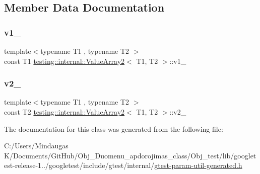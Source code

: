 \subsection{Member Data Documentation}
\mbox{\label{classtesting_1_1internal_1_1_value_array2_ac046b318215dba521f67369bdb4ce535}} 
\subsubsection{\texorpdfstring{v1\_}{v1\_}}
{\footnotesize\ttfamily template$<$typename T1 , typename T2 $>$ \\
const T1 \mbox{\hyperlink{classtesting_1_1internal_1_1_value_array2}{testing\+::internal\+::\+Value\+Array2}}$<$ T1, T2 $>$\+::v1\+\_\+\hspace{0.3cm}{\ttfamily [private]}}

\mbox{\label{classtesting_1_1internal_1_1_value_array2_aa90e4945eb1d86d978485db2666d25b1}} 
\subsubsection{\texorpdfstring{v2\_}{v2\_}}
{\footnotesize\ttfamily template$<$typename T1 , typename T2 $>$ \\
const T2 \mbox{\hyperlink{classtesting_1_1internal_1_1_value_array2}{testing\+::internal\+::\+Value\+Array2}}$<$ T1, T2 $>$\+::v2\+\_\+\hspace{0.3cm}{\ttfamily [private]}}



The documentation for this class was generated from the following file\+:\begin{DoxyCompactItemize}
\item 
C\+:/\+Users/\+Mindaugas K/\+Documents/\+Git\+Hub/\+Obj\+\_\+\+Duomenu\+\_\+apdorojimas\+\_\+class/\+Obj\+\_\+test/lib/googletest-\/release-\/1../googletest/include/gtest/internal/\mbox{\hyperlink{gtest-param-util-generated_8h}{gtest-\/param-\/util-\/generated.\+h}}\end{DoxyCompactItemize}
